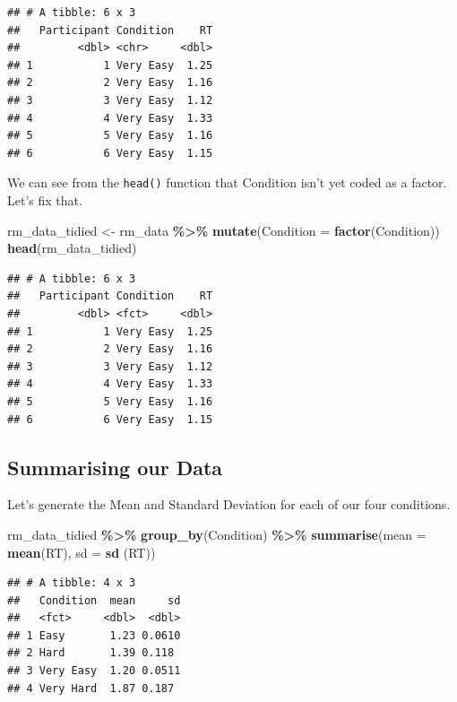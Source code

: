 \documentclass[
]{book}
\newenvironment{Shaded}{\begin{snugshade}}{\end{snugshade}}
\newcommand{\AttributeTok}[1]{\textcolor[rgb]{0.13,0.29,0.53}{#1}}
\newcommand{\FunctionTok}[1]{\textcolor[rgb]{0.13,0.29,0.53}{\textbf{#1}}}
\newcommand{\NormalTok}[1]{#1}
\newcommand{\OtherTok}[1]{\textcolor[rgb]{0.56,0.35,0.01}{#1}}
\newcommand{\SpecialCharTok}[1]{\textcolor[rgb]{0.81,0.36,0.00}{\textbf{#1}}}
\begin{document}
\begin{verbatim}
## # A tibble: 6 x 3
##   Participant Condition    RT
##         <dbl> <chr>     <dbl>
## 1           1 Very Easy  1.25
## 2           2 Very Easy  1.16
## 3           3 Very Easy  1.12
## 4           4 Very Easy  1.33
## 5           5 Very Easy  1.16
## 6           6 Very Easy  1.15
\end{verbatim}

We can see from the \texttt{head()} function that Condition isn't yet coded as a factor. Let's fix that.

\begin{Shaded}
\begin{Highlighting}[]
\NormalTok{rm\_data\_tidied }\OtherTok{\textless{}{-}}\NormalTok{ rm\_data }\SpecialCharTok{\%\textgreater{}\%}
  \FunctionTok{mutate}\NormalTok{(}\AttributeTok{Condition =} \FunctionTok{factor}\NormalTok{(Condition))}
\FunctionTok{head}\NormalTok{(rm\_data\_tidied)}
\end{Highlighting}
\end{Shaded}

\begin{verbatim}
## # A tibble: 6 x 3
##   Participant Condition    RT
##         <dbl> <fct>     <dbl>
## 1           1 Very Easy  1.25
## 2           2 Very Easy  1.16
## 3           3 Very Easy  1.12
## 4           4 Very Easy  1.33
## 5           5 Very Easy  1.16
## 6           6 Very Easy  1.15
\end{verbatim}

\hypertarget{summarising-our-data-1}{%
\subsection{Summarising our Data}\label{summarising-our-data-1}}

Let's generate the Mean and Standard Deviation for each of our four conditions.

\begin{Shaded}
\begin{Highlighting}[]
\NormalTok{rm\_data\_tidied }\SpecialCharTok{\%\textgreater{}\%}
  \FunctionTok{group\_by}\NormalTok{(Condition) }\SpecialCharTok{\%\textgreater{}\%}
  \FunctionTok{summarise}\NormalTok{(}\AttributeTok{mean =} \FunctionTok{mean}\NormalTok{(RT), }\AttributeTok{sd =} \FunctionTok{sd}\NormalTok{ (RT))}
\end{Highlighting}
\end{Shaded}

\begin{verbatim}
## # A tibble: 4 x 3
##   Condition  mean     sd
##   <fct>     <dbl>  <dbl>
## 1 Easy       1.23 0.0610
## 2 Hard       1.39 0.118 
## 3 Very Easy  1.20 0.0511
## 4 Very Hard  1.87 0.187
\end{verbatim}
\end{document}
